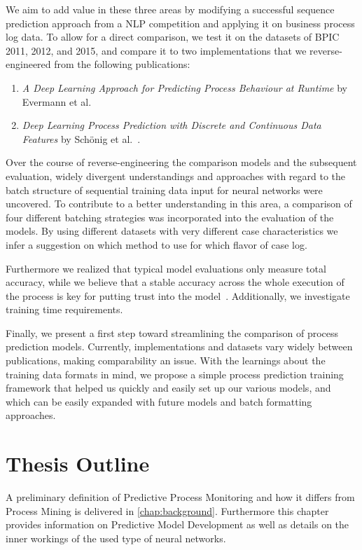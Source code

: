 We aim to add value in these three areas by modifying a successful sequence prediction approach from a NLP competition and applying it on business process log data. To allow for a direct comparison, we test it on the datasets of BPIC 2011, 2012, and 2015, and compare it to two implementations that we reverse-engineered from the following publications:

\begin{enumerate}
    \item \textit{A Deep Learning Approach for Predicting Process Behaviour at Runtime} by Evermann et al.~\cite{evermann2016}
    \item\textit{Deep Learning Process Prediction with Discrete and Continuous Data Features} by Schönig et al.~\cite{schoenig2018}.
\end{enumerate}

Over the course of reverse-engineering the comparison models and the subsequent evaluation, widely divergent understandings and approaches with regard to the batch structure of sequential training data input for neural networks were uncovered. To contribute to a better understanding in this area, a comparison of four different batching strategies was incorporated into the evaluation of the models. By using different datasets with very different case characteristics we infer a suggestion on which method to use for which flavor of case log.

Furthermore we realized that typical model evaluations only measure total accuracy, while we believe that a stable accuracy across the whole execution of the process is key for putting trust into the model~\cite{francescomarino2015, boehmer2018probability}. Additionally, we investigate training time requirements.

Finally, we present a first step toward streamlining the comparison of process prediction models. Currently, implementations and datasets vary widely between publications, making comparability an issue. With the learnings about the training data formats in mind, we propose a simple process prediction training framework that helped us quickly and easily set up our various models, and which can be easily expanded with future models and batch formatting approaches.

\section{Thesis Outline}\label{sec:intro:outline}
A preliminary definition of Predictive Process Monitoring and how it differs from Process Mining is delivered in \autoref{chap:background}. Furthermore this chapter provides information on Predictive Model Development as well as details on the inner workings of the used type of neural networks.

